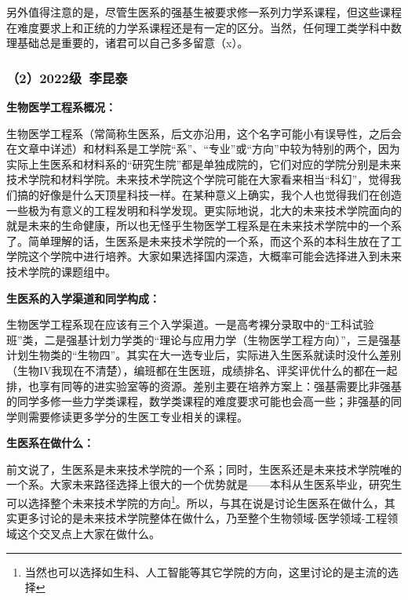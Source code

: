 \documentclass[11pt,oneside]{book}
\begin{document}
\vspace{10pt}

另外值得注意的是，尽管生医系的强基生被要求修一系列力学系课程，但这些课程在难度要求上和正统的力学系课程还是有一定的区分。当然，任何理工类学科中数理基础总是重要的，诸君可以自己多多留意（x）。

\subsubsection{（2）2022级\ 李昆泰}
\textbf{生物医学工程系概况：}

生物医学工程系（常简称生医系，后文亦沿用，这个名字可能小有误导性，之后会在文章中详述）和材料系是工学院“系”、“专业”或“方向”中较为特别的两个，因为实际上生医系和材料系的“研究生院”都是单独成院的，它们对应的学院分别是未来技术学院和材料学院。未来技术学院这个学院可能在大家看来相当“科幻”，觉得我们搞的好像是什么天顶星科技一样。在某种意义上确实，我个人也觉得我们在创造一些极为有意义的工程发明和科学发现。更实际地说，北大的未来技术学院面向的就是未来的生命健康，所以也无怪乎生物医学工程系是在未来技术学院中的一个系了。简单理解的话，生医系是未来技术学院的一个系，而这个系的本科生放在了工学院这个学院中进行培养。大家如果选择国内深造，大概率可能会选择进入到未来技术学院的课题组中。

\vspace{10pt}

\textbf{生医系的入学渠道和同学构成：}

生物医学工程系现在应该有三个入学渠道。一是高考裸分录取中的“工科试验班”类，二是强基计划力学类的“理论与应用力学（生物医学工程方向）”，三是强基计划生物类的“生物四”。其实在大一选专业后，实际进入生医系就读时没什么差别（生物IV我现在不清楚），编班都在生医班，成绩排名、评奖评优什么的都在一起排，也享有同等的进实验室等的资源。差别主要在培养方案上：强基需要比非强基的同学多修一些力学类课程，数学类课程的难度要求可能也会高一些；非强基的同学则需要修读更多学分的生医工专业相关的课程。

\vspace{10pt}

\textbf{生医系在做什么：}

前文说了，生医系是未来技术学院的一个系；同时，生医系还是未来技术学院唯的一个系。大家未来路径选择上很大的一个优势就是——本科从生医系毕业，研究生可以选择整个未来技术学院的方向\footnote{当然也可以选择如生科、人工智能等其它学院的方向，这里讨论的是主流的选择}。所以，与其在说是讨论生医系在做什么，其实更多讨论的是未来技术学院整体在做什么，乃至整个生物领域-医学领域-工程领域这个交叉点上大家在做什么。

\vspace{10pt}
\end{document}
